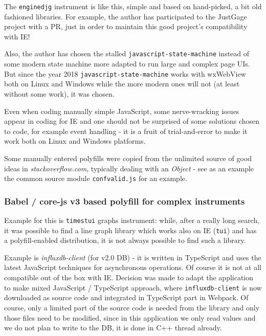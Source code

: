 \documentclass[11pt]{article}
\begin{document}
    The \texttt{enginedjg} instrument is like this, simple and based on
hand-picked, a bit old fashioned libraries. For example, the author has
participated to the JustGage project with a PR, just in order to
maintain this good project's compatibility with IE!

    Also, the author has chosen the stalled
\texttt{javascript-state-machine} instead of some modern state machine
more adapted to run large and complex page UIs. But since the year 2018
\texttt{javascript-state-machine} works with wxWebView both on Linux and
Windows while the more modern ones will not (at least without some
work), it was chosen.

    Even when coding manually simple JavaScript, some nerve-wracking issues
appear in coding for IE and one should not be surprised of some
solutions chosen to code, for example event handling - it is a fruit of
trial-and-error to make it work both on Linux and Windows platforms.

    Some manually entered polyfills were copied from the unlimited source of
good ideas in \emph{stackoverflow.com}, typically dealing with an
\emph{Object} - see as an example the common source module
\texttt{confvalid.js} for an example.

    \hypertarget{babel-core-js-v3-based-polyfill-for-complex-instruments}{%
\subsubsection{Babel / core-js v3 based polyfill for complex
instruments}\label{babel-core-js-v3-based-polyfill-for-complex-instruments}}

    Example for this is \texttt{timestui} graphs instrument: while, after a
really long search, it was possible to find a line graph library which
works also on IE (\texttt{tui}) and has a polyfill-enabled distribution,
it is not always possible to find such a library.

    Example is \emph{influxdb-client} (for v2.0 DB) - it is written in
TypeScript and uses the latest JavaScript techniques for asynchronous
operations. Of course it is not at all compatible out of the box with
IE. Decision was made to adapt the application to make mixed JavaScript
/ TypeScript approach, where \texttt{influxdb-client} is now downloaded
as source code and integrated in TypeScript part in Webpack. Of course,
only a limited part of the source code is needed from the library and
only those files need to be modified, since in this application we only
read values and we do not plan to write to the DB, it is done in C++
thread already.
\end{document}

